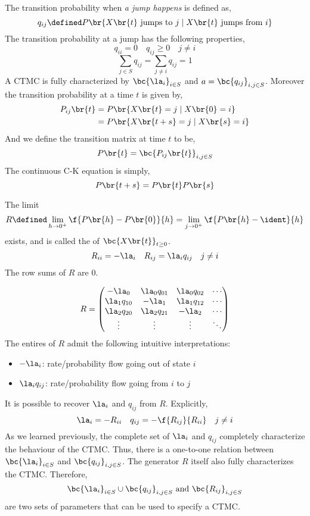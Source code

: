 \documentclass{article}
\begin{document}

    The transition probability when \textit{a jump happens} is defined as,
    \[ q_{ij} \defined P\br{X\br{t} \text{ jumps to } j \mid X\br{t} \text{ jumps from } i} \]
    The transition probability at a jump has the following properties,
    \[ q_{ii} = 0 \quad q_{ij} \geq 0 \quad j\neq i \]
    \[ \sum_{j \in S}q_{ij} = \sum_{j \neq i} q_{ij} = 1 \]
    A CTMC is fully characterized by $\bc{\la_i}_{i \in S}$ and $a = \bc{q_{ij}}_{i,j \in S}$. Moreover the transition probability at a time $t$ is given by,
    \begin{align*}
        P_{ij}\br{t}
        &= P\br{X\br{t} = j \mid X\br{0} = i} \\
        &= P\br{X\br{t+s} = j \mid X\br{s} = i}
    \end{align*}
    And we define the transition matrix at time $t$ to be,
    \[ P\br{t} = \bc{P_{ij}\br{t}}_{i,j \in S} \]
    The continuous C-K equation is simply,
    \[ P\br{t+s} = P\br{t}P\br{s} \]
    \begin{definition}
        The limit
        \[ R \defined \lim_{h \to 0^{+}} \f{P\br{h} - P\br{0}}{h} = \lim_{j \to 0^+} \f{P\br{h} - \ident}{h} \]
        exists, and is called the  of $\bc{X\br{t}}_{t \geq 0}$.
        \[ R_{ii} = - \la_{i} \quad R_{ij} = \la_i q_{ij} \quad j \neq i \]
        The row sums of $R$ are $0$.
    \end{definition}
    \[ R = \begin{pmatrix}
        -\la_0 & \la_0 q_{01} & \la_0 q_{02} & \cdots \\
        \la_1q_{10} & -\la_{1} & \la_1q_{12} & \cdots \\
        \la_2q_{20} & \la_2q_{21} & -\la_2 & \cdots \\
        \vdots & \vdots & \vdots & \ddots \\
    \end{pmatrix} \]
    The entires of $R$ admit the following intuitive interpretations:
    \begin{itemize}
        \item $-\la_i$: rate/probability flow going out of state $i$
        \item $\la_i q_{ij}$: rate/probability flow going from $i$ to $j$
    \end{itemize}
    It is possible to recover $\la_i$ and $q_{ij}$ from $R$. Explicitly,
    \[ \la_i = - R_{ii} \quad q_{ij} = -\f{R_{ij}}{R_{ii}} \quad j \neq i \]
    As we learned previously, the complete set of $\la_i$ and $q_{ij}$ completely characterize the behaviour of the CTMC. Thus, there is a one-to-one relation between $\bc{\la_i}_{i \in S}$ and $\bc{q_{ij}}_{i,j \in S}$. The generator $R$ itself also fully characterizes the CTMC. Therefore,
    \[ \bc{\la_i}_{i \in S} \cup \bc{q_{ij}}_{i,j \in S} \text{ and } \bc{R_{ij}}_{i,j \in S}\]
    are two sets of parameters that can be used to specify a CTMC.
\end{document}
